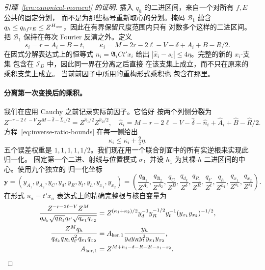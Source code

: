 \documentclass[11pt,a4paper]{article}
\numberwithin{equation}{section}
\numberwithin{figure}{section}
\theoremstyle{definition}
\theoremstyle{remark}
\begin{document}
\begin{proof}[引理~\ref{lem:canonical-moment} 的证明]
插入 \(q_h\) 的二进区间，来自一个对所有 \(f,E\) 公共的固定分划，
而不是为那些标号重新取心的分划。掩码 \(\mathcal B_1\)
蕴含 \(q_h\le q_{hf^2E}\le Z^{H_{\rm use}}\)，因此在有界保留尺度范围内只有
对数多个这样的二进区间。
把 \(\mathcal B_1\) 保持在每次 Fourier 反演之外。定义
\[
 s_i=r-A_i-B-t,\qquad
 \kappa_i=M-2r-2\ell-V-\delta+A_i+B-R/2.
\]
在因式分解表达式上的恒等式 \(n_i=\mathfrak A_iCt'x_i\)
给出 \(|\widehat x_i-s_i|\le4\eta\)。完整的新的 \(x_i\)-支集
包含在 \(\mathcal I_D\) 中，因此同一界在分离之后直接
在该支集上成立，而不只在原来的乘积支集上成立。
当前前因子中所用的重构形式乘积也
包含在那里。

\paragraph{分离第一次变换后的乘积。}
我们在应用 Cauchy 之前记录实际前因子。它恰好
按两个列侧分裂为
\[
 Z^{-r-2\ell-V}Z^{M-\widehat\delta-\widehat L_1/2}
       =Z^{\widehat\kappa_1/2}Z^{\widehat\kappa_2/2},
 \quad
 \widehat\kappa_i=M-r-2\ell-V-\widehat\delta-\widehat n_i
                  +\widehat A_i+\widehat B-\widehat R/2.
\]
方程~\eqref{eq:inverse-ratio-bounds} 在每一侧给出
\begin{equation}\label{eq:inverse-first-prefactor-error}
 \widehat\kappa_i\le\kappa_i+\tfrac92\eta.
\end{equation}
五个误差权重是 \(1,1,1,1,1/2\)。我们现在用一个联合剖面中的所有实逆根来实现此
归一化。
固定第一个二进、射线与位置模式 \(\sigma\)，并设 \(h_1\)
为其裸-\(h\) 二进区间的中心。使用九个独立的
归一化坐标
\[
 \boldsymbol y=(y_{A_1},y_{A_2},y_C,y_d,y_R,y_t,y_h,y_{x_1},y_{x_2})
 =\left(\frac{q_{\mathfrak A_1}}{Z^{A_1}},
 \frac{q_{\mathfrak A_2}}{Z^{A_2}},\frac{q_C}{Z^B},
 \frac{q_{d_k}}{Z^\delta},\frac{q_{R_1}}{Z^R},\frac{q_{t'}}{Z^t},
 \frac{q_h}{Z^{h_1}},\frac{q_{x_1}}{Z^{s_1}},\frac{q_{x_2}}{Z^{s_2}}\right).
\]
在形式 \(u_a=t'x_a\) 表达式上的精确完整根与核自变量为
\begin{equation}\label{eq:inverse-first-root-kernel}
 \begin{split}
 \frac{Z^{-r-2\ell-V}Z^M}
 {q_{d_k}\sqrt{q_{R_1}}q_{t'}\sqrt{q_{x_1}q_{x_2}}}
 &=Z^{(\kappa_1+\kappa_2)/2}
 y_d^{-1}y_R^{-1/2}y_t^{-1}(y_{x_1}y_{x_2})^{-1/2},\\
 \frac{Z^Mq_h}{q_{d_k}q_{R_1}q_{t'}^2q_{x_1}q_{x_2}}
 &=A_{{\rm ker},1}\frac{y_h}{y_dy_Ry_t^2y_{x_1}y_{x_2}},\\
 A_{{\rm ker},1}&=Z^{M+h_1-\delta-R-2t-s_1-s_2}.
 \end{split}
\end{equation}

\end{proof}
\end{document}
